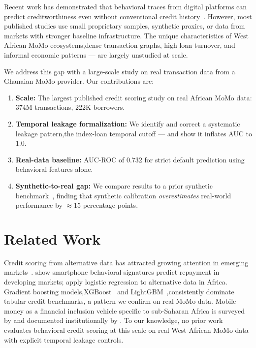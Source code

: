 \documentclass{article}
\begin{document}
Recent work has demonstrated that behavioral traces from digital
platforms can predict creditworthiness even without conventional credit
history~\cite{bjorkegren2020behavior,francis2019effective}.
However, most published studies use small proprietary samples, synthetic
proxies, or data from markets with stronger baseline infrastructure.
The unique characteristics of West African MoMo ecosystems,dense
transaction graphs, high loan turnover, and informal economic patterns —
are largely unstudied at scale.

We address this gap with a large-scale study on real transaction data
from a Ghanaian MoMo provider.
Our contributions are:
\begin{enumerate}
  \item \textbf{Scale:} The largest published credit scoring study on
        real African MoMo data: 374M transactions, 222K borrowers.
  \item \textbf{Temporal leakage formalization:} We identify and correct
        a systematic leakage pattern,the index-loan temporal cutoff —
        and show it inflates AUC to 1.0.
  \item \textbf{Real-data baseline:} AUC-ROC of 0.732 for strict default
        prediction using behavioral features alone.
  \item \textbf{Synthetic-to-real gap:} We compare results to a prior
        synthetic benchmark~\cite{anonymous2026seqcredit}, finding that
        synthetic calibration \emph{overestimates} real-world
        performance by $\approx$15 percentage points.
\end{enumerate}

\section{Related Work}

Credit scoring from alternative data has attracted growing attention in
emerging markets~\cite{bjorkegren2020behavior,francis2019effective,ngwenya2024credit}.
\citet{bjorkegren2020behavior} show smartphone behavioral signatures
predict repayment in developing markets; \citet{ngwenya2024credit} apply
logistic regression to alternative data in Africa.
Gradient boosting models,XGBoost~\cite{chen2016xgboost} and
LightGBM~\cite{ke2017lightgbm},consistently dominate tabular credit
benchmarks, a pattern we confirm on real MoMo data.
Mobile money as a financial inclusion vehicle specific to sub-Saharan
Africa is surveyed by \citet{osabutey2024mobile} and documented
institutionally by \citet{africanenda2025siips}.
To our knowledge, no prior work evaluates behavioral credit scoring at
this scale on real West African MoMo data with explicit temporal leakage
controls.
\end{document}
